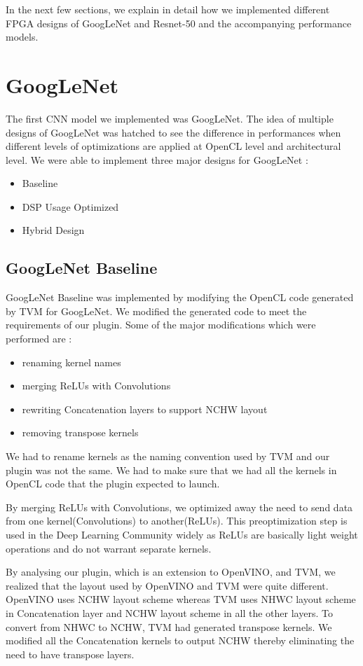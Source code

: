 In the next few sections, we explain in detail how we implemented different FPGA designs of GoogLeNet and Resnet-50 and the accompanying performance models.



\section{GoogLeNet}

The first CNN model we implemented was GoogLeNet. The idea of multiple designs of GoogLeNet was hatched to see the difference in performances when different levels of optimizations are applied at OpenCL level and architectural level. 
We were able to implement three major designs for GoogLeNet :
\begin{itemize}
  \item Baseline
  \item DSP Usage Optimized
  \item Hybrid Design
\end{itemize}  

\subsection{GoogLeNet Baseline}

GoogLeNet Baseline was implemented by modifying the OpenCL code generated by TVM for GoogLeNet. We modified the generated code to meet the requirements of our plugin. Some of the major modifications which were performed are :
\begin{itemize}
  \item renaming kernel names
  \item merging ReLUs with Convolutions
  \item rewriting Concatenation layers to support NCHW layout
  \item removing transpose kernels
\end{itemize}  
We had to rename kernels as the naming convention used by TVM and our plugin was not the same. We  had to make sure that we had all the kernels in OpenCL code that the plugin expected to launch.

By merging ReLUs with Convolutions, we optimized away the need to send data from one kernel(Convolutions) to another(ReLUs). This preoptimization step is used in the Deep Learning Community widely as ReLUs are basically light weight operations and do not warrant separate kernels.

By analysing our plugin, which is an extension to OpenVINO, and TVM, we realized that the layout used by OpenVINO and TVM were quite different. OpenVINO uses NCHW layout scheme whereas TVM uses NHWC layout scheme in Concatenation layer and NCHW layout scheme in all the other layers. To convert from NHWC to NCHW, TVM had generated transpose kernels. We modified all the Concatenation kernels to output NCHW thereby eliminating the need to have transpose layers.  

